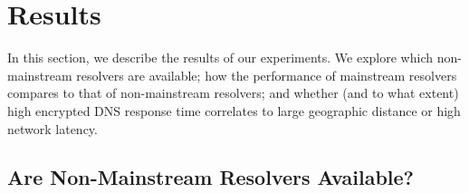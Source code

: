 \section{Results}\label{sec:results} 

In this section, we describe the results of our experiments.  We explore which
non-mainstream resolvers are available; how
the performance of mainstream resolvers compares to that of non-mainstream
resolvers; and whether (and to what extent) high encrypted DNS response time
correlates to large geographic distance or high network latency.

\subsection{Are Non-Mainstream Resolvers Available?}

